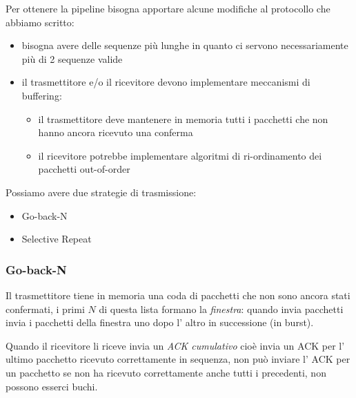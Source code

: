 Per ottenere la pipeline bisogna apportare alcune modifiche al protocollo che abbiamo scritto:
\begin{itemize}
    \item bisogna avere delle sequenze più lunghe in quanto ci servono necessariamente più di 2 sequenze valide
    \item il trasmettitore e/o il ricevitore devono implementare meccanismi di buffering:
    \begin{itemize}
        \item il trasmettitore deve mantenere in memoria tutti i pacchetti che non hanno ancora ricevuto una conferma
        \item il ricevitore potrebbe implementare algoritmi di ri-ordinamento dei pacchetti out-of-order
    \end{itemize}
\end{itemize}
Possiamo avere due strategie di trasmissione:
\begin{itemize}
    \item Go-back-N
    \item Selective Repeat
\end{itemize}

\subsubsection{Go-back-N}
Il trasmettitore tiene in memoria una coda di pacchetti che non sono ancora stati confermati, i primi $N$ di questa lista formano la \emph{finestra}: quando invia pacchetti invia i pacchetti della finestra uno dopo l' altro in successione (in burst).

Quando il ricevitore li riceve invia un \emph{ACK cumulativo} cioè invia un ACK per l' ultimo pacchetto ricevuto correttamente in sequenza, non può inviare l' ACK per un pacchetto se non ha ricevuto correttamente anche tutti i precedenti, non possono esserci buchi.

